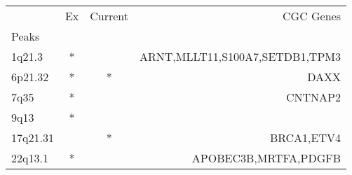 \begin{tabular}{lccr}
\toprule
{} & Ex & Current &                       CGC Genes \\
Peaks    &    &         &                                 \\
\midrule
1q21.3   &  * &         &  ARNT,MLLT11,S100A7,SETDB1,TPM3 \\
6p21.32  &  * &       * &                            DAXX \\
7q35     &  * &         &                         CNTNAP2 \\
9q13     &  * &         &                                 \\
17q21.31 &    &       * &                      BRCA1,ETV4 \\
22q13.1  &  * &         &            APOBEC3B,MRTFA,PDGFB \\
\bottomrule
\end{tabular}

